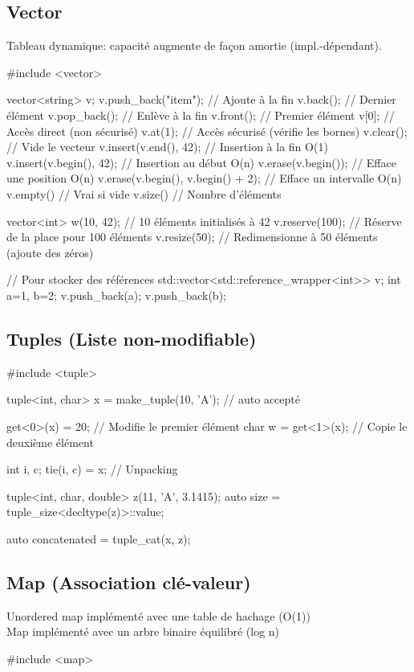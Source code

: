 \documentclass{article}
\begin{document}
\begin{multicols*}{4}
\subsection*{Vector}
Tableau dynamique: capacité augmente de façon amortie (impl.-dépendant).
\begin{cppcode}
#include <vector>

vector<string> v;
v.push_back("item"); // Ajoute à la fin
v.back();        // Dernier élément
v.pop_back();    // Enlève à la fin
v.front();       // Premier élément
v[0];            // Accès direct (non sécurisé)
v.at(1);         // Accès sécurisé (vérifie les bornes)
v.clear();       // Vide le vecteur
v.insert(v.end(), 42); // Insertion à la fin O(1)
v.insert(v.begin(), 42); // Insertion au début O(n)
v.erase(v.begin()); // Efface une position O(n)
v.erase(v.begin(), v.begin() + 2); // Efface un intervalle O(n)
v.empty() // Vrai si vide
v.size()  // Nombre d'éléments

vector<int> w(10, 42); // 10 éléments initialisés à 42
v.reserve(100); // Réserve de la place pour 100 éléments
v.resize(50);  // Redimensionne à 50 éléments (ajoute des zéros)

// Pour stocker des références
std::vector<std::reference_wrapper<int>> v;
int a=1, b=2; v.push_back(a); v.push_back(b);
\end{cppcode}

\subsection*{Tuples (Liste non-modifiable)}

\begin{cppcode}
#include <tuple>

tuple<int, char> x = make_tuple(10, 'A'); // auto accepté

get<0>(x) = 20; // Modifie le premier élément
char w = get<1>(x); // Copie le deuxième élément

int i, c;
tie(i, c) = x; // Unpacking

tuple<int, char, double> z(11, 'A', 3.1415);
auto size = tuple_size<decltype(z)>::value;

auto concatenated = tuple_cat(x, z);
\end{cppcode}

\subsection*{Map (Association clé-valeur)}
Unordered map implémenté avec une table de hachage (O(1))\\
Map implémenté avec un arbre binaire équilibré (log n)
\begin{cppcode}
#include <map>


\end{cppcode}
\end{multicols*}
\end{document}
